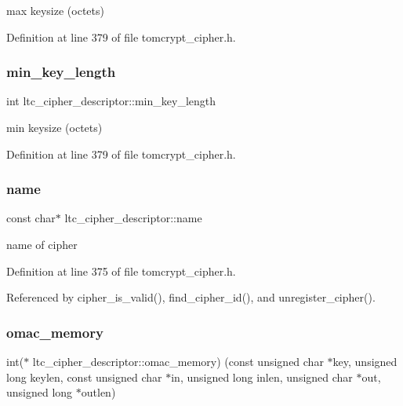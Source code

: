 max keysize (octets) 



Definition at line 379 of file tomcrypt\+\_\+cipher.\+h.

\mbox{\label{structltc__cipher__descriptor_abc6acf3a67f3cb3e8af9f94868014c3a}} 
\subsubsection{\texorpdfstring{min\_key\_length}{min\_key\_length}}
{\footnotesize\ttfamily int ltc\+\_\+cipher\+\_\+descriptor\+::min\+\_\+key\+\_\+length}



min keysize (octets) 



Definition at line 379 of file tomcrypt\+\_\+cipher.\+h.

\mbox{\label{structltc__cipher__descriptor_af0cf296468366b502b0584af87168058}} 
\subsubsection{\texorpdfstring{name}{name}}
{\footnotesize\ttfamily const char$\ast$ ltc\+\_\+cipher\+\_\+descriptor\+::name}



name of cipher 



Definition at line 375 of file tomcrypt\+\_\+cipher.\+h.



Referenced by cipher\+\_\+is\+\_\+valid(), find\+\_\+cipher\+\_\+id(), and unregister\+\_\+cipher().

\mbox{\label{structltc__cipher__descriptor_af0b442d77ee8c5ef6806d0bc8a2c1b4a}} 
\subsubsection{\texorpdfstring{omac\_memory}{omac\_memory}}
{\footnotesize\ttfamily int($\ast$ ltc\+\_\+cipher\+\_\+descriptor\+::omac\+\_\+memory) (const unsigned char $\ast$key, unsigned long keylen, const unsigned char $\ast$in, unsigned long inlen, unsigned char $\ast$out, unsigned long $\ast$outlen)}



